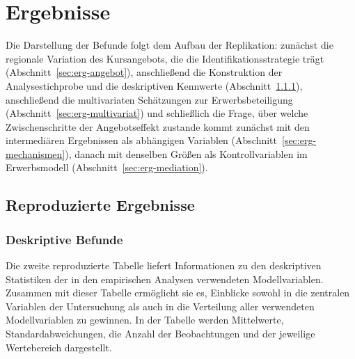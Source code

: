 %

\chapter{Ergebnisse}
\label{cha:ergebnisse}

Die Darstellung der Befunde folgt dem Aufbau der Replikation: zun\"achst die
regionale Variation des Kursangebots, die die Identifikationsstrategie tr\"agt
(Abschnitt~\ref{sec:erg-angebot}), anschlie{\ss}end die Konstruktion der
Analysestichprobe und die deskriptiven Kennwerte
(Abschnitt~\ref{sec:erg-deskriptiv}), anschlie{\ss}end die multivariaten
Sch\"atzungen zur Erwerbsbeteiligung (Abschnitt~\ref{sec:erg-multivariat}) und
schlie{\ss}lich die Frage, \"uber welche Zwischenschritte der Angebotseffekt
zustande kommt \textendash{} zun\"achst mit den intermedi\"aren Ergebnissen als
abh\"angigen Variablen (Abschnitt~\ref{sec:erg-mechanismen}), danach mit
denselben Gr\"o{\ss}en als Kontrollvariablen im Erwerbsmodell
(Abschnitt~\ref{sec:erg-mediation}).


\section{Reproduzierte Ergebnisse}



\subsection{Deskriptive Befunde}
\label{sec:erg-deskriptiv}


Die zweite reproduzierte Tabelle liefert Informationen zu den deskriptiven Statistiken der in den empirischen Analysen verwendeten Modellvariablen. Zusammen mit dieser Tabelle ermöglicht sie es, Einblicke sowohl in die zentralen Variablen der Untersuchung als auch in die Verteilung aller verwendeten Modellvariablen zu gewinnen. In der Tabelle werden Mittelwerte, Standardabweichungen, die Anzahl der Beobachtungen und der jeweilige Wertebereich dargestellt.

